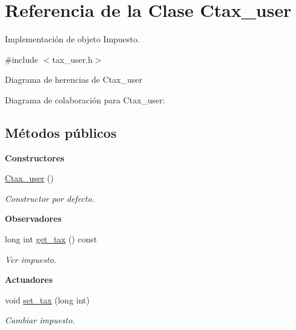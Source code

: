 \hypertarget{class_ctax__user}{}\section{Referencia de la Clase Ctax\+\_\+user}
\label{class_ctax__user}


Implementación de objeto Impuesto.  




{\ttfamily \#include $<$tax\+\_\+user.\+h$>$}



Diagrama de herencias de Ctax\+\_\+user


Diagrama de colaboración para Ctax\+\_\+user\+:
\subsection*{Métodos públicos}
\begin{Indent}{\bf Constructores}\par
\begin{DoxyCompactItemize}
\item 
\hyperlink{class_ctax__user_ae6899d23d2994b08747ab5797bd4c8ac}{Ctax\+\_\+user} ()\hypertarget{class_ctax__user_ae6899d23d2994b08747ab5797bd4c8ac}{}\label{class_ctax__user_ae6899d23d2994b08747ab5797bd4c8ac}

\begin{DoxyCompactList}\small\item\em Constructor por defecto. \end{DoxyCompactList}\end{DoxyCompactItemize}
\end{Indent}
\begin{Indent}{\bf Observadores}\par
\begin{DoxyCompactItemize}
\item 
long int \hyperlink{class_ctax__user_a824f6643ab14fb2ae4233641a08aff68}{get\+\_\+tax} () const 
\begin{DoxyCompactList}\small\item\em Ver impuesto. \end{DoxyCompactList}\end{DoxyCompactItemize}
\end{Indent}
\begin{Indent}{\bf Actuadores}\par
\begin{DoxyCompactItemize}
\item 
void \hyperlink{class_ctax__user_abc465fdfa520b34c223016c1a926ddb1}{set\+\_\+tax} (long int)
\begin{DoxyCompactList}\small\item\em Cambiar impuesto. \end{DoxyCompactList}\end{DoxyCompactItemize}
\end{Indent}


